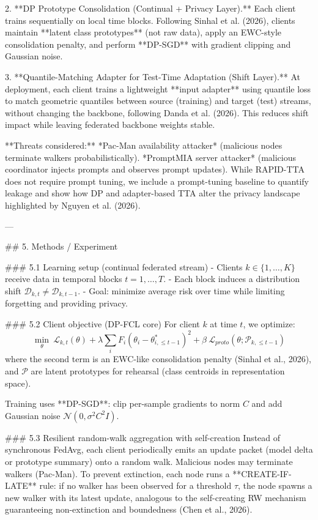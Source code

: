 2. **DP Prototype Consolidation (Continual + Privacy Layer).**  
   Each client trains sequentially on local time blocks. Following Sinhal et al. (2026), clients maintain **latent class prototypes** (not raw data), apply an EWC-style consolidation penalty, and perform **DP-SGD** with gradient clipping and Gaussian noise.

3. **Quantile-Matching Adapter for Test-Time Adaptation (Shift Layer).**  
   At deployment, each client trains a lightweight **input adapter** using quantile loss to match geometric quantiles between source (training) and target (test) streams, without changing the backbone, following Danda et al. (2026). This reduces shift impact while leaving federated backbone weights stable.

**Threats considered:**  
*Pac-Man availability attacker* (malicious nodes terminate walkers probabilistically).  
*PromptMIA server attacker* (malicious coordinator injects prompts and observes prompt updates). While RAPID-TTA does not require prompt tuning, we include a prompt-tuning baseline to quantify leakage and show how DP and adapter-based TTA alter the privacy landscape highlighted by Nguyen et al. (2026).

---

## 5. Methods / Experiment  

### 5.1 Learning setup (continual federated stream)  
- Clients \(k \in \{1,\dots,K\}\) receive data in temporal blocks \(t=1,\dots,T\).  
- Each block induces a distribution shift \( \mathcal{D}_{k,t} \neq \mathcal{D}_{k,t-1}\).  
- Goal: minimize average risk over time while limiting forgetting and providing privacy.

### 5.2 Client objective (DP-FCL core)  
For client \(k\) at time \(t\), we optimize:
\[
\min_{\theta} \ \mathcal{L}_{k,t}(\theta) + \lambda \sum_i F_i(\theta_i-\theta^{*}_{i,\le t-1})^2 + \beta \ \mathcal{L}_{proto}(\theta; \mathcal{P}_{k,\le t-1})
\]
where the second term is an EWC-like consolidation penalty (Sinhal et al., 2026), and \(\mathcal{P}\) are latent prototypes for rehearsal (class centroids in representation space).

Training uses **DP-SGD**: clip per-sample gradients to norm \(C\) and add Gaussian noise \(\mathcal{N}(0,\sigma^2 C^2 I)\).

### 5.3 Resilient random-walk aggregation with self-creation  
Instead of synchronous FedAvg, each client periodically emits an update packet (model delta or prototype summary) onto a random walk. Malicious nodes may terminate walkers (Pac-Man). To prevent extinction, each node runs a **CREATE-IF-LATE** rule: if no walker has been observed for a threshold \(\tau\), the node spawns a new walker with its latest update, analogous to the self-creating RW mechanism guaranteeing non-extinction and boundedness (Chen et al., 2026).

